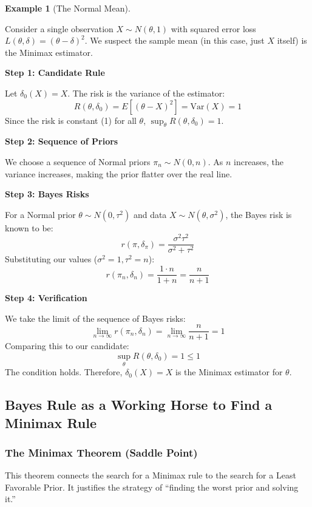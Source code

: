 \documentclass[
  letterpaper,
  DIV=11,
  numbers=noendperiod]{scrreprt}
\renewcommand{\[}{\begin{equation}}
\renewcommand{\]}{\end{equation}}
\theoremstyle{definition}
\theoremstyle{plain}
\theoremstyle{plain}
\theoremstyle{plain}
\theoremstyle{definition}
\newtheorem{example}{Example}[chapter]
\theoremstyle{plain}
\theoremstyle{remark}
\begin{document}
\begin{example}[The Normal
Mean]\protect\hypertarget{exm-normal-mean}{}\label{exm-normal-mean}

Consider a single observation \(X \sim N(\theta, 1)\) with squared error
loss \(L(\theta, \delta) = (\theta - \delta)^2\). We suspect the sample
mean (in this case, just \(X\) itself) is the Minimax estimator.

\textbf{Step 1: Candidate Rule}

Let \(\delta_0(X) = X\). The risk is the variance of the estimator:
\[ R(\theta, \delta_0) = E[(\theta - X)^2] = \text{Var}(X) = 1 \] Since
the risk is constant (1) for all \(\theta\),
\(\sup_\theta R(\theta, \delta_0) = 1\).

\textbf{Step 2: Sequence of Priors}

We choose a sequence of Normal priors \(\pi_n \sim N(0, n)\). As \(n\)
increases, the variance increases, making the prior flatter over the
real line.

\textbf{Step 3: Bayes Risks}

For a Normal prior \(\theta \sim N(0, \tau^2)\) and data
\(X \sim N(\theta, \sigma^2)\), the Bayes risk is known to be:
\[ r(\pi, \delta_\pi) = \frac{\sigma^2 \tau^2}{\sigma^2 + \tau^2} \]
Substituting our values (\(\sigma^2=1, \tau^2=n\)):
\[ r(\pi_n, \delta_n) = \frac{1 \cdot n}{1 + n} = \frac{n}{n+1} \]

\textbf{Step 4: Verification}

We take the limit of the sequence of Bayes risks:
\[ \lim_{n \to \infty} r(\pi_n, \delta_n) = \lim_{n \to \infty} \frac{n}{n+1} = 1 \]
Comparing this to our candidate:
\[ \sup_{\theta} R(\theta, \delta_0) = 1 \le 1 \] The condition holds.
Therefore, \(\delta_0(X) = X\) is the Minimax estimator for \(\theta\).

\end{example}

\subsection{Bayes Rule as a Working Horse to Find a Minimax
Rule}\label{bayes-rule-as-a-working-horse-to-find-a-minimax-rule}

\subsubsection{The Minimax Theorem (Saddle
Point)}\label{the-minimax-theorem-saddle-point}

This theorem connects the search for a Minimax rule to the search for a
Least Favorable Prior. It justifies the strategy of ``finding the worst
prior and solving it.''
\end{document}
